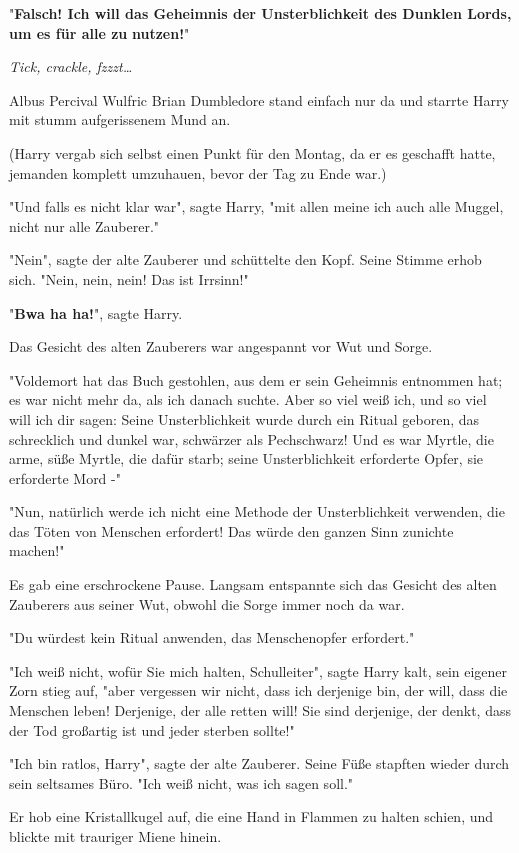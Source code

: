 {"\textbf{Falsch! Ich will das Geheimnis der Unsterblichkeit des Dunklen Lords, um es für alle zu} \textbf{nutzen!}"

\emph{Tick, crackle, fzzzt…}

Albus Percival Wulfric Brian Dumbledore stand einfach nur da und starrte Harry mit stumm aufgerissenem Mund an.

(Harry vergab sich selbst einen Punkt für den Montag, da er es geschafft hatte, jemanden komplett umzuhauen, bevor der Tag zu Ende war.)

"Und falls es nicht klar war", sagte Harry, "mit allen meine ich auch alle Muggel, nicht nur alle Zauberer."

"Nein", sagte der alte Zauberer und schüttelte den Kopf. Seine Stimme erhob sich. "Nein, nein, nein! Das ist Irrsinn!"

"\textbf{Bwa ha ha!}", sagte Harry.

Das Gesicht des alten Zauberers war angespannt vor Wut und Sorge.

"Voldemort hat das Buch gestohlen, aus dem er sein Geheimnis entnommen hat; es war nicht mehr da, als ich danach suchte. Aber so viel weiß ich, und so viel will ich dir sagen: Seine Unsterblichkeit wurde durch ein Ritual geboren, das schrecklich und dunkel war, schwärzer als Pechschwarz! Und es war Myrtle, die arme, süße Myrtle, die dafür starb; seine Unsterblichkeit erforderte Opfer, sie erforderte Mord -"

"Nun, natürlich werde ich nicht eine Methode der Unsterblichkeit verwenden, die das Töten von Menschen erfordert! Das würde den ganzen Sinn zunichte machen!"

Es gab eine erschrockene Pause. Langsam entspannte sich das Gesicht des alten Zauberers aus seiner Wut, obwohl die Sorge immer noch da war.

"Du würdest kein Ritual anwenden, das Menschenopfer erfordert."

"Ich weiß nicht, wofür Sie mich halten, Schulleiter", sagte Harry kalt, sein eigener Zorn stieg auf, "aber vergessen wir nicht, dass ich derjenige bin, der will, dass die Menschen leben! Derjenige, der alle retten will! Sie sind derjenige, der denkt, dass der Tod großartig ist und jeder sterben sollte!"

"Ich bin ratlos, Harry", sagte der alte Zauberer. Seine Füße stapften wieder durch sein seltsames Büro. "Ich weiß nicht, was ich sagen soll."

Er hob eine Kristallkugel auf, die eine Hand in Flammen zu halten schien, und blickte mit trauriger Miene hinein.

}
